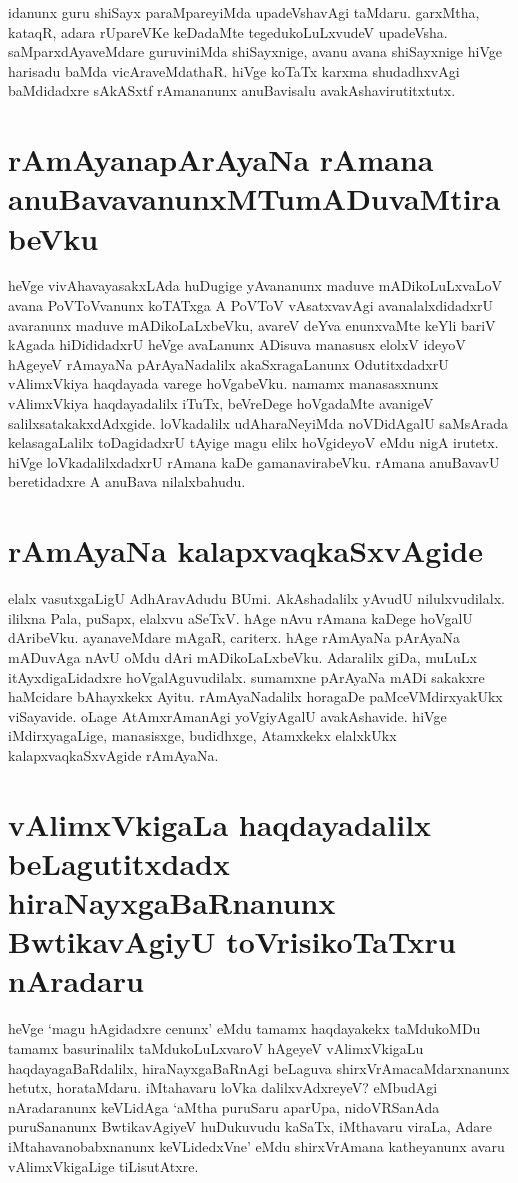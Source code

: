 idanunx guru shiSayx paraMpareyiMda upadeVshavAgi taMdaru. garxMtha, kataqR, adara rUpareVKe keDadaMte tegedukoLuLxvudeV upadeVsha. saMparxdAyaveMdare guruviniMda shiSayxnige, avanu avana shiSayxnige hiVge harisadu baMda vicAraveMdathaR. hiVge koTaTx karxma shudadhxvAgi baMdidadxre sAkASxtf rAmananunx anuBavisalu avakAshavirutitxtutx.

\section*{rAmAyanapArAyaNa rAmana anuBavavanunxMTumADuvaMtirabeVku}

heVge vivAhavayasakxLAda huDugige yAvananunx maduve mADikoLuLxvaLoV avana PoVToVvanunx koTATxga A‌ PoVToV vAsatxvavAgi avanalalxdidadxrU avaranunx maduve mADikoLaLxbeVku, avareV deYva enunxvaMte keYli bariV kAgada hiDididadxrU heVge avaLanunx ADisuva manasusx elolxV ideyoV hAgeyeV rAmayaNa pArAyaNadalilx akaSxragaLanunx OdutitxdadxrU vAlimxVkiya haqdayada varege hoVgabeVku. namamx manasasxnunx vAlimxVkiya haqdayadalilx iTuTx, beVreDege hoVgadaMte avanigeV salilxsatakakxdAdxgide. loVkadalilx udAharaNeyiMda noVDidAgalU saMsArada kelasagaLalilx toDagidadxrU tAyige magu elilx hoVgideyoV eMdu nigA irutetx. hiVge loVkadalilxdadxrU rAmana kaDe gamanavirabeVku. rAmana anuBavavU beretidadxre A anuBava nilalxbahudu. 

\section*{rAmAyaNa kalapxvaqkaSxvAgide}

elalx vasutxgaLigU AdhAravAdudu BUmi. AkAshadalilx yAvudU nilulxvudilalx. ililxna Pala, puSapx, elalxvu aSeTxV. hAge nAvu rAmana kaDege hoVgalU dAribeVku. ayanaveMdare mAgaR, cariterx. hAge rAmAyaNa pArAyaNa mADuvAga nAvU oMdu dAri mADikoLaLxbeVku. Adaralilx giDa, muLuLx itAyxdigaLidadxre hoVgalAguvudilalx. sumamxne pArAyaNa mADi sakakxre haMcidare bAhayxkekx Ayitu. rAmAyaNadalilx horagaDe paMceVMdirxyakUkx viSayavide. oLage AtAmxrAmanAgi yoVgiyAgalU avakAshavide. hiVge iMdirxyagaLige, manasisxge, budidhxge, Atamxkekx  elalxkUkx kalapxvaqkaSxvAgide rAmAyaNa. 

\section*{vAlimxVkigaLa haqdayadalilx beLagutitxdadx hiraNayxgaBaRnanunx BwtikavAgiyU toVrisikoTaTxru nAradaru}

heVge `magu hAgidadxre cenunx' eMdu tamamx haqdayakekx  taMdukoMDu tamamx basurinalilx taMdukoLuLxvaroV hAgeyeV vAlimxVkigaLu haqdayagaBaRdalilx, hiraNayxgaBaRnAgi beLaguva shirxVrAmacaMdarxnanunx hetutx, horataMdaru. iMtahavaru loVka dalilxvAdxreyeV? eMbudAgi nAradaranunx keVLidAga `aMtha puruSaru aparUpa, nidoVRSanAda puruSananunx BwtikavAgiyeV huDukuvudu kaSaTx, iMthavaru viraLa, Adare iMtahavanobabxnanunx keVLidedxVne' eMdu shirxVrAmana katheyanunx avaru vAlimxVkigaLige tiLisutAtxre. 


